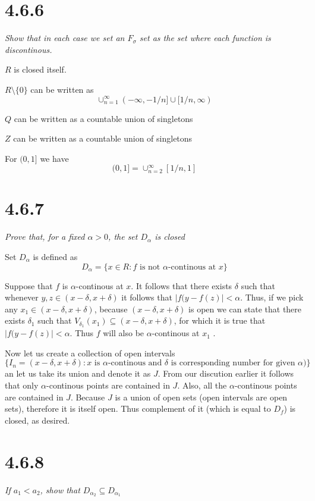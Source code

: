 \documentclass[11pt,oneside,titlepage]{book}
\begin{document}
\section*{4.6.6}
\textit{Show that in each case we set an $F_\sigma$ set as the set where
  each function is discontinous.}

$R$ is closed itself.

$R \setminus \{0\}$ can be written as
$$\cup_{n=1}^{\infty} (-\infty, -1/n] \cup [1/n, \infty)$$

$Q$ can be written as a countable union of singletons

$Z$ can be written as a countable union of singletons

For $(0, 1]$ we have 
$$(0, 1] = \cup_{n = 2}^{\infty} [1/n, 1]$$

\section*{4.6.7}
\textit{Prove that, for a fixed $\alpha > 0$, the set $D_\alpha$ is closed}

Set $D_\alpha$ is defined as
$$D_\alpha = \{x \in R: f \text{ is not }\alpha\text{-continous at }x\}$$

Suppose that $f$ is $\alpha$-continous at $x$. It follows that there exists
$\delta$ such that whenever $y, z \in (x - \delta, x + \delta)$ it follows that
$|f(y - f(z)| < \alpha$. Thus, if we pick any
$x_1 \in (x - \delta, x + \delta)$, because $(x - \delta, x + \delta)$ is open
we can state that there exists $\delta_1$ such that
$V_{\delta_1}(x_1) \subseteq (x -\delta, x + \delta)$, for which it is
true that $|f(y - f(z)| < \alpha$. Thus $f$ will  
 also be $\alpha$-continous at  $x_1$ .

Now let us create a collection of open intervals
$$\{I_n = (x - \delta, x + \delta): x \text{ is $\alpha$-continous and
  $\delta$ is corresponding number for given $\alpha$})\}$$
an let us take its union and denote it as $J$. From our discution earlier
it follows that only $\alpha$-continous points are contained in $J$.
Also, all the $\alpha$-continous points are contained in $J$.
Because $J$ is a union of open sets (open intervals are open sets), therefore
it is itself open. Thus complement of it (which is equal to $D_f$) is closed,
as desired.

\section*{4.6.8}
\textit{If $a_1 < a_2$, show that $D_{\alpha_2} \subseteq D_{\alpha_1}$}
\end{document}

